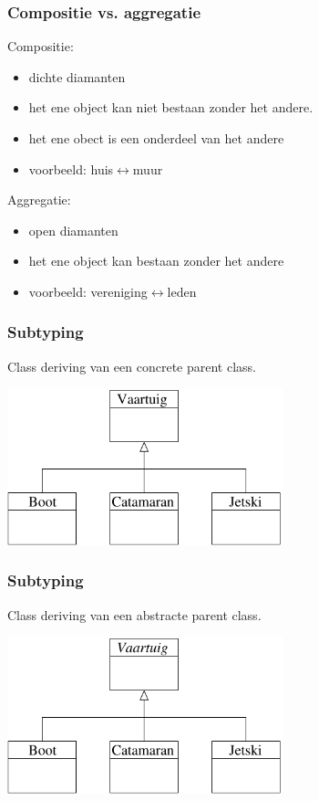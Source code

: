 \documentclass{beamer}
\begin{document}
\begin{frame}\frametitle{Compositie vs. aggregatie}
Compositie:
  \begin{itemize}
  \item dichte diamanten
  \item het ene object kan niet bestaan zonder het andere.
  \item het ene obect is een onderdeel van het andere
  \item voorbeeld: huis$\leftrightarrow$muur\pause
  \end{itemize}
Aggregatie:
\begin{itemize}
  \item open diamanten
  \item het ene object kan bestaan zonder het andere
  \item voorbeeld: vereniging$\leftrightarrow$leden
\end{itemize}
\end{frame}

\begin{frame}\frametitle{Subtyping}
Class deriving van een concrete parent class.
\begin{center}
\includegraphics[width=8cm]{subt}
\end{center}  
\end{frame}

\begin{frame}
\frametitle{Subtyping}
Class deriving van een abstracte parent class.
\begin{center}
\includegraphics[width=8cm]{subt2}
\end{center}  

\end{frame}
\end{document}
